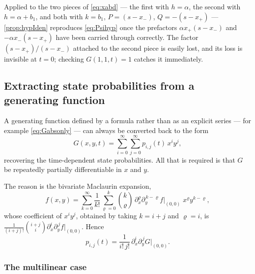 \begin{remark}
Applied to the two pieces of \cref{eq:xabd} --- the first with $h=\alpha$, the second with
$h=\alpha+b_1$, and both with $k=b_1$, $P=(s-x_-)$, $Q=-(s-x_+)$ --- \cref{prop:hypIden}
reproduces \cref{eq:Psihyp} once the prefactors $\alpha x_+(s-x_-)$ and $-\alpha x_-(s-x_+)$
have been carried through correctly. The factor $(s-x_+)/(s-x_-)$ attached to the second
piece is easily lost, and its loss is invisible at $t=0$; checking $G(1,1,t)=1$ catches it
immediately.
\end{remark}

\subsection{Extracting state probabilities from a generating function}
\label{app:extract}

A generating function defined by a formula rather than as an explicit series --- for
example \cref{eq:Gabsonly} --- can always be converted back to the form
\begin{equation}
\label{eq:series1}
G(x,y,t) = \sum^{\infty}_{i=0}\sum^{\infty}_{j=0} p_{i,j}(t)\,x^iy^j ,
\end{equation}
recovering the time-dependent state probabilities. All that is required is that $G$ be
repeatedly partially differentiable in $x$ and $y$.

The reason is the bivariate Maclaurin expansion,
\begin{equation*}
f(x,y) = \sum^{\infty}_{k=0}\frac{1}{k!}\sum^{k}_{\varrho=0}\binom{k}{\varrho}\,
\partial_x^{\varrho}\partial_y^{\,k-\varrho}f\Big|_{(0,0)}\;x^{\varrho}y^{k-\varrho} ,
\end{equation*}
whose coefficient of $x^iy^j$, obtained by taking $k=i+j$ and $\varrho=i$, is
$\frac{1}{(i+j)!}\binom{i+j}{i}\partial_x^i\partial_y^{\,j}f\big|_{(0,0)}$. Hence
\begin{equation}
\label{eq:stateProb}
p_{i,j}(t) = \frac{1}{i!\,j!}\,\partial_x^i\partial_y^{\,j}G\Big|_{(0,0)} .
\end{equation}

\subsubsection*{The multilinear case}

